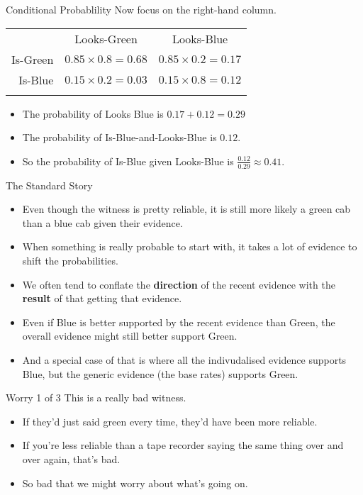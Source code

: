 \documentclass[
  ignorenonframetext,
]{beamer}
\providecommand{\tightlist}{%
  \setlength{\itemsep}{0pt}\setlength{\parskip}{0pt}}
\renewcommand{\,}{\text{, }}
\begin{document}
\begin{frame}{Conditional Probablility}
\protect\hypertarget{conditional-probablility}{}
Now focus on the right-hand column.

\begin{longtable}[]{@{}rcc@{}}
\toprule
& Looks-Green & Looks-Blue \\ \addlinespace
\midrule
\endhead
Is-Green & \(0.85 \times 0.8 = 0.68\) &
\(0.85 \times 0.2 = 0.17\) \\ \addlinespace
Is-Blue & \(0.15 \times 0.2 = 0.03\) &
\(0.15 \times 0.8 = 0.12\) \\ \addlinespace
\bottomrule
\end{longtable}

\pause

\begin{itemize}
\tightlist
\item
  The probability of Looks Blue is \(0.17 + 0.12 = 0.29\) \pause
\item
  The probability of Is-Blue-and-Looks-Blue is \(0.12\). \pause
\item
  So the probability of Is-Blue given Looks-Blue is
  \(\frac{0.12}{0.29} \approx 0.41\).
\end{itemize}
\end{frame}

\begin{frame}{The Standard Story}
\protect\hypertarget{the-standard-story}{}
\begin{itemize}[<+->]
\tightlist
\item
  Even though the witness is pretty reliable, it is still more likely a
  green cab than a blue cab given their evidence.
\item
  When something is really probable to start with, it takes a lot of
  evidence to shift the probabilities.
\item
  We often tend to conflate the \textbf{direction} of the recent
  evidence with the \textbf{result} of that getting that evidence.
\item
  Even if Blue is better supported by the recent evidence than Green,
  the overall evidence might still better support Green.
\item
  And a special case of that is where all the indivudalised evidence
  supports Blue, but the generic evidence (the base rates) supports
  Green.
\end{itemize}
\end{frame}

\begin{frame}{Worry 1 of 3}
\protect\hypertarget{worry-1-of-3}{}
This is a really bad witness.

\begin{itemize}
\tightlist
\item
  If they'd just said green every time, they'd have been more reliable.
\item
  If you're less reliable than a tape recorder saying the same thing
  over and over again, that's bad.
\item
  So bad that we might worry about what's going on.
\end{itemize}
\end{frame}
\end{document}
